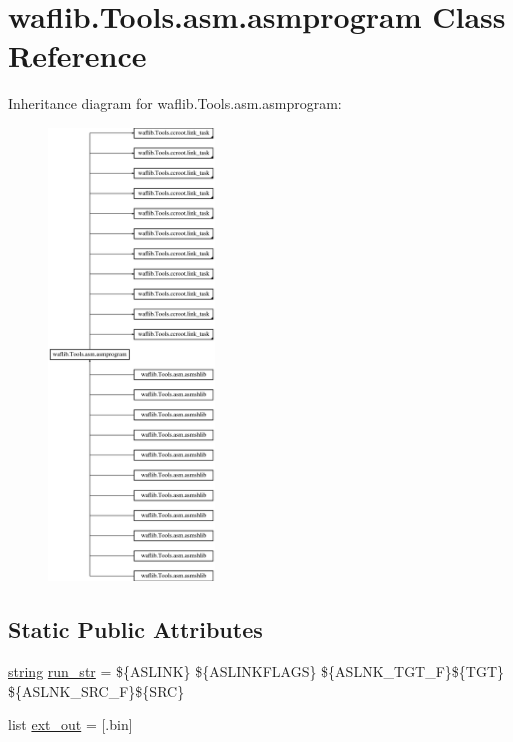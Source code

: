 \hypertarget{classwaflib_1_1_tools_1_1asm_1_1asmprogram}{}\section{waflib.\+Tools.\+asm.\+asmprogram Class Reference}
\label{classwaflib_1_1_tools_1_1asm_1_1asmprogram}
Inheritance diagram for waflib.\+Tools.\+asm.\+asmprogram\+:\begin{figure}[H]
\begin{center}
\leavevmode
\includegraphics[height=12.000000cm]{classwaflib_1_1_tools_1_1asm_1_1asmprogram}
\end{center}
\end{figure}
\subsection*{Static Public Attributes}
\begin{DoxyCompactItemize}
\item 
\hyperlink{test__lib_f_l_a_c_2format_8c_ab02026ad0de9fb6c1b4233deb0a00c75}{string} \hyperlink{classwaflib_1_1_tools_1_1asm_1_1asmprogram_a30b2e1186a342dd6108a1148f4987695}{run\+\_\+str} = \textquotesingle{}\$\{A\+S\+L\+I\+NK\} \$\{A\+S\+L\+I\+N\+K\+F\+L\+A\+GS\} \$\{A\+S\+L\+N\+K\+\_\+\+T\+G\+T\+\_\+F\}\$\{T\+GT\} \$\{A\+S\+L\+N\+K\+\_\+\+S\+R\+C\+\_\+F\}\$\{S\+RC\}\textquotesingle{}
\item 
list \hyperlink{classwaflib_1_1_tools_1_1asm_1_1asmprogram_a0edab3f700809632cca7fa5c80892c36}{ext\+\_\+out} = \mbox{[}\textquotesingle{}.bin\textquotesingle{}\mbox{]}
\end{DoxyCompactItemize}
